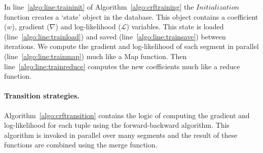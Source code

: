 \documentclass[11pt,letterpaper]{article}
\begin{document}
In line~\ref{algo:line:traininit} of Algorithm~\ref{algo:crftraining} the $\mathit{Initialization}$ function creates a `state' object in the database.
This object contains a coefficient ($w$), gradient ($\nabla$) and log-likelihood ($\mathcal{L}$) variables.
This state is loaded (line~\ref{algo:line:trainload}) and saved (line~\ref{algo:line:trainsave}) between iterations.
We compute the gradient and log-likelihood of each segment in parallel (line~\ref{algo:line:trainmap})  much like a Map function.
Then line~\ref{algo:line:trainreduce} computes the new coefficients much like a reduce function.





\paragraph{Transition strategies.}
Algorithm~\ref{algo:crftransition} contains the logic of computing the gradient and log-likelihood for each tuple using the forward-backward
algorithm.
This algorithm is invoked in parallel over many segments and the result of these functions are combined using the merge function.
\end{document}
